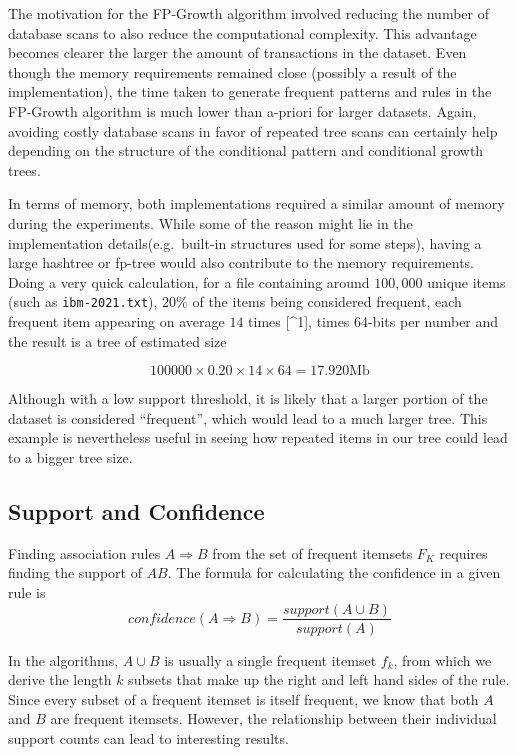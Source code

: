 \documentclass[
  paper=a4,
,captions=tableheading
]{scrartcl}
\newcommand{\passthrough}[1]{#1}
\begin{document}
The motivation for the FP-Growth algorithm involved reducing the number
of database scans to also reduce the computational complexity. This
advantage becomes clearer the larger the amount of transactions in the
dataset. Even though the memory requirements remained close (possibly a
result of the implementation), the time taken to generate frequent
patterns and rules in the FP-Growth algorithm is much lower than
a-priori for larger datasets. Again, avoiding costly database scans in
favor of repeated tree scans can certainly help depending on the
structure of the conditional pattern and conditional growth trees.

In terms of memory, both implementations required a similar amount of
memory during the experiments. While some of the reason might lie in the
implementation details(e.g.~built-in structures used for some steps),
having a large hashtree or fp-tree would also contribute to the memory
requirements. Doing a very quick calculation, for a file containing
around \(100,000\) unique items (such as
\passthrough{\lstinline!ibm-2021.txt!}), \(20\%\) of the items being
considered frequent, each frequent item appearing on average \(14\)
times {[}\^{}1{]}, times 64-bits per number and the result is a tree of
estimated size

\begin{equation}
100000 \times 0.20 \times 14 \times 64 = 17.920\textrm{Mb}
\end{equation}

Although with a low support threshold, it is likely that a larger
portion of the dataset is considered ``frequent'', which would lead to a
much larger tree. This example is nevertheless useful in seeing how
repeated items in our tree could lead to a bigger tree size.

\hypertarget{support-and-confidence}{%
\subsection{Support and Confidence}\label{support-and-confidence}}

Finding association rules \(A \Rightarrow B\) from the set of frequent
itemsets \(F_{K}\) requires finding the support of \(AB\). The formula
for calculating the confidence in a given rule is \begin{equation}
confidence(A \Rightarrow B) = \frac{support(A \cup B)}{support(A)}
\end{equation}

In the algorithms, \(A\cup B\) is usually a single frequent itemset
\(f_{k}\), from which we derive the length \(k\) subsets that make up
the right and left hand sides of the rule. Since every subset of a
frequent itemset is itself frequent, we know that both \(A\) and \(B\)
are frequent itemsets. However, the relationship between their
individual support counts can lead to interesting results.
\end{document}
